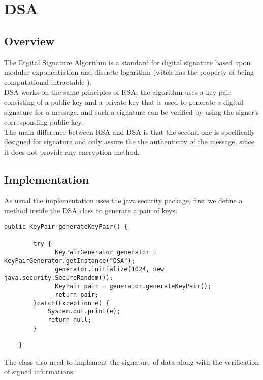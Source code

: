 \documentclass{article}
\begin{document}
\section{DSA}

\subsection{Overview}
The Digital Signature Algorithm is a standard for digital signature based upon modular exponentiation and discrete logarithm (witch has the property of being computational intractable ).\\
DSA works on the same principles of RSA: the algorithm uses a key pair consisting of a public key and a private key that is used to generate a digital signature for a message, and such a signature can be verified by using the signer's corresponding public key.\\
The main difference between RSA and DSA is that the second one is specifically designed for signature and only assure the the authenticity of the message, since it does not provide any encryption method.

\subsection{Implementation}

As usual the implementation uses the java.security package, first we define a method inside the DSA class to generate a pair of keys:

\begin{verbatim}
public KeyPair generateKeyPair() {
		
		try {
			  KeyPairGenerator generator = KeyPairGenerator.getInstance("DSA");
			  generator.initialize(1024, new java.security.SecureRandom());
			  KeyPair pair = generator.generateKeyPair();
			  return pair;
		}catch(Exception e) {
			System.out.print(e);
			return null;
		}
	  
	}
\end{verbatim}
The class also need to implement the signature of data along with the verification of signed informations:
\end{document}
